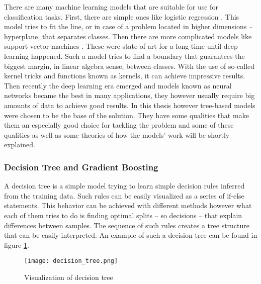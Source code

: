 \documentclass[a4paper,twoside,12pt]{book}
\newcommand*\setcaptioncitation[1]{\def\captioncitation{\textit{Source:}~#1}}
\let\captioncitation\relax
\begin{document}
There are many machine learning models that are suitable for use for classification tasks. First, there are simple ones like logistic regression \cite{wright1995logistic}. This model tries to fit the line, or in case of a problem located in higher dimensions -- hyperplane, that separates classes. Then there are more complicated models like support vector machines  \cite{noble2006support}. These were state-of-art for a long time until deep learning \cite{goodfellow2016deep} happened. Such a model tries to find a boundary that guarantees the biggest margin, in linear algebra sense, between classes. With the use of so-called kernel tricks and functions known as kernels, it can achieve impressive results. Then recently the deep learning era emerged and models known as neural networks became the best in many applications, they however usually require big amounts of data to achieve good results.
In this thesis however tree-based models \cite{buntine1992learning} were chosen to be the base of the solution. They have some qualities that make them an especially good choice for tackling the problem and some of these qualities as well as some theories of how the models' work will be shortly explained.

\subsubsection{Decision Tree and Gradient Boosting}

A decision tree is a simple model trying to learn simple decision rules inferred from the training data. Such rules can be easily visualized as a series of if-else statements. This behavior can be achieved with different methods however what each of them tries to do is finding optimal splits -- so decisions -- that explain differences between samples. The sequence of such rules creates a tree structure that can be easily interpreted. An example of such a decision tree can be found in figure \ref{fig:tree}.

\begin{figure}[!htb]
  \centering
  \texttt{[image: decision\_tree.png]}
  \setcaptioncitation{\url{https://cutt.ly/hh7jmin}}
  \caption{Visualization of decision tree}
  \label{fig:tree}
\end{figure}
\end{document}
